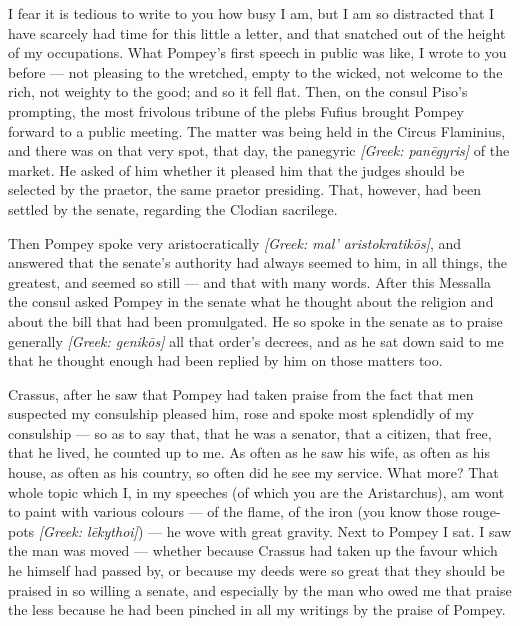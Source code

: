 

 I fear it is tedious to write to you how busy I am, but I am so distracted that I have scarcely had time for this little a letter, and that snatched out of the height of my occupations. What Pompey's first speech in public was like, I wrote to you before --- not pleasing to the wretched, empty to the wicked, not welcome to the rich, not weighty to the good; and so it fell flat. Then, on the consul Piso's prompting, the most frivolous tribune of the plebs Fufius brought Pompey forward to a public meeting. The matter was being held in the Circus Flaminius, and there was on that very spot, that day, the panegyric \textit{[Greek: pan\=egyris]} of the market. He asked of him whether it pleased him that the judges should be selected by the praetor, the same praetor presiding. That, however, had been settled by the senate, regarding the Clodian sacrilege.

 Then Pompey spoke very aristocratically \textit{[Greek: mal' aristokratik\=os]}, and answered that the senate's authority had always seemed to him, in all things, the greatest, and seemed so still --- and that with many words. After this Messalla the consul asked Pompey in the senate what he thought about the religion and about the bill that had been promulgated. He so spoke in the senate as to praise generally \textit{[Greek: genik\=os]} all that order's decrees, and as he sat down said to me that he thought enough had been replied by him on those matters too.

 Crassus, after he saw that Pompey had taken praise from the fact that men suspected my consulship pleased him, rose and spoke most splendidly of my consulship --- so as to say that, that he was a senator, that a citizen, that free, that he lived, he counted up to me. As often as he saw his wife, as often as his house, as often as his country, so often did he see my service. What more? That whole topic which I, in my speeches (of which you are the Aristarchus), am wont to paint with various colours --- of the flame, of the iron (you know those rouge-pots \textit{[Greek: l\=ekythoi]}) --- he wove with great gravity. Next to Pompey I sat. I saw the man was moved --- whether because Crassus had taken up the favour which he himself had passed by, or because my deeds were so great that they should be praised in so willing a senate, and especially by the man who owed me that praise the less because he had been pinched in all my writings by the praise of Pompey.

